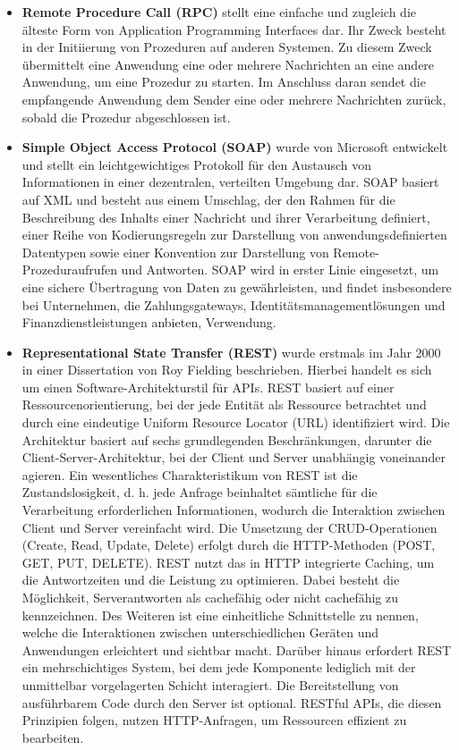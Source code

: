 \begin{itemize}

	\item \textbf{Remote Procedure Call (RPC)} stellt eine einfache und zugleich die älteste Form von Application Programming Interfaces dar. Ihr Zweck besteht in der Initiierung von Prozeduren auf anderen Systemen. Zu diesem Zweck übermittelt eine Anwendung eine oder mehrere Nachrichten an eine andere Anwendung, um eine Prozedur zu starten. Im Anschluss daran sendet die empfangende Anwendung dem Sender eine oder mehrere Nachrichten zurück, sobald die Prozedur abgeschlossen ist. 
	\citep{TUM}

	\item \textbf{Simple Object Access Protocol (SOAP)} wurde von Microsoft entwickelt und stellt ein leichtgewichtiges Protokoll für den Austausch von Informationen in einer dezentralen, verteilten Umgebung dar. SOAP basiert auf XML und besteht aus einem Umschlag, der den Rahmen für die Beschreibung des Inhalts einer Nachricht und ihrer Verarbeitung definiert, einer Reihe von Kodierungsregeln zur Darstellung von anwendungsdefinierten Datentypen sowie einer Konvention zur Darstellung von Remote-Prozeduraufrufen und Antworten. SOAP wird in erster Linie eingesetzt, um eine sichere Übertragung von Daten zu gewährleisten, und findet insbesondere bei Unternehmen, die Zahlungsgateways, Identitätsmanagementlösungen und Finanzdienstleistungen anbieten, Verwendung.
	\citep{TUM}
\newpage
	\item \textbf{Representational State Transfer (REST)} wurde erstmals im Jahr 2000 in einer Dissertation von Roy Fielding beschrieben. Hierbei handelt es sich um einen Software-Architekturstil für APIs. REST basiert auf einer Ressourcenorientierung, bei der jede Entität als Ressource betrachtet und durch eine eindeutige Uniform Resource Locator (URL) identifiziert wird. Die Architektur basiert auf sechs grundlegenden Beschränkungen, darunter die Client-Server-Architektur, bei der Client und Server unabhängig voneinander agieren. Ein wesentliches Charakteristikum von REST ist die Zustandslosigkeit, d. h. jede Anfrage beinhaltet sämtliche für die Verarbeitung erforderlichen Informationen, wodurch die Interaktion zwischen Client und Server vereinfacht wird. Die Umsetzung der CRUD-Operationen (Create, Read, Update, Delete) erfolgt durch die HTTP-Methoden (POST, GET, PUT, DELETE). REST nutzt das in HTTP integrierte Caching, um die Antwortzeiten und die Leistung zu optimieren. Dabei besteht die Möglichkeit, Serverantworten als cachefähig oder nicht cachefähig zu kennzeichnen. Des Weiteren ist eine einheitliche Schnittstelle zu nennen, welche die Interaktionen zwischen unterschiedlichen Geräten und Anwendungen erleichtert und sichtbar macht. Darüber hinaus erfordert REST ein mehrschichtiges System, bei dem jede Komponente lediglich mit der unmittelbar vorgelagerten Schicht interagiert. Die Bereitstellung von ausführbarem Code durch den Server ist optional. RESTful APIs, die diesen Prinzipien folgen, nutzen HTTP-Anfragen, um Ressourcen effizient zu bearbeiten. \citep{Fielding2000}  \citep{graphqlreplacerest}


\end{itemize}
